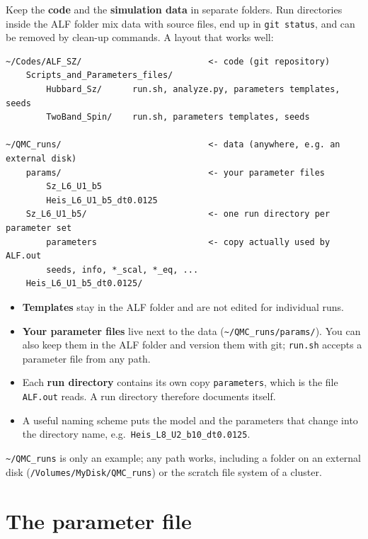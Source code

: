 \documentclass[11pt,a4paper]{article}
\newcommand{\f}[1]{\texttt{#1}}          %
\begin{document}
Keep the \textbf{code} and the \textbf{simulation data} in separate folders. Run
directories inside the ALF folder mix data with source files, end up in \f{git status},
and can be removed by clean-up commands. A layout that works well:
\begin{lstlisting}
~/Codes/ALF_SZ/                         <- code (git repository)
    Scripts_and_Parameters_files/
        Hubbard_Sz/      run.sh, analyze.py, parameters templates, seeds
        TwoBand_Spin/    run.sh, parameters templates, seeds

~/QMC_runs/                             <- data (anywhere, e.g. an external disk)
    params/                             <- your parameter files
        Sz_L6_U1_b5
        Heis_L6_U1_b5_dt0.0125
    Sz_L6_U1_b5/                        <- one run directory per parameter set
        parameters                      <- copy actually used by ALF.out
        seeds, info, *_scal, *_eq, ...
    Heis_L6_U1_b5_dt0.0125/
\end{lstlisting}
\begin{itemize}
  \item \textbf{Templates} stay in the ALF folder and are not edited for individual runs.
  \item \textbf{Your parameter files} live next to the data (\f{\textasciitilde/QMC\_runs/params/}).
        You can also keep them in the ALF folder and version them with git; \f{run.sh}
        accepts a parameter file from any path.
  \item Each \textbf{run directory} contains its own copy \f{parameters}, which is the file
        \f{ALF.out} reads. A run directory therefore documents itself.
  \item A useful naming scheme puts the model and the parameters that change into the
        directory name, e.g.\ \f{Heis\_L8\_U2\_b10\_dt0.0125}.
\end{itemize}
\f{\textasciitilde/QMC\_runs} is only an example; any path works, including a folder on an
external disk (\f{/Volumes/MyDisk/QMC\_runs}) or the scratch file system of a cluster.

\section{The parameter file}
\label{sec:parameters}
\end{document}
